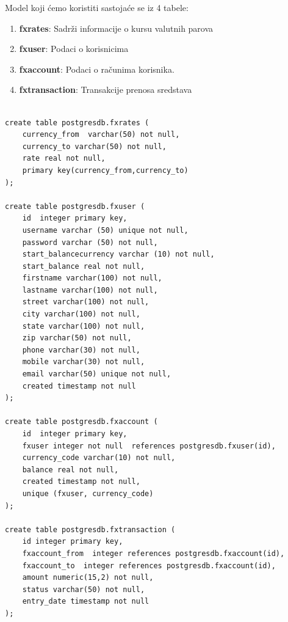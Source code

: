 \documentclass[12pt,oneside]{memoir}
\begin{document}
Model koji ćemo koristiti sastojaće se iz 4 tabele:

\begin{enumerate}
\item[\textbullet] \textbf{fxrates}: {
	Sadrži informacije o kursu valutnih parova
}
\item[\textbullet] \textbf{fxuser}:{
	Podaci o korisnicima
}
\item[\textbullet] \textbf{fxaccount}:{
	Podaci o računima korisnika.
}
\item[\textbullet] \textbf{fxtransaction}:{
	Transakcije prenosa sredstava
}
\end{enumerate}


\begin{lstlisting}[title={setup-postgres-model.sql},captionpos=t]

create table postgresdb.fxrates (
	currency_from  varchar(50) not null,
	currency_to varchar(50) not null,
	rate real not null,
	primary key(currency_from,currency_to)
);

create table postgresdb.fxuser (
	id  integer primary key,
	username varchar (50) unique not null,
	password varchar (50) not null,
	start_balancecurrency varchar (10) not null,
	start_balance real not null,
	firstname varchar(100) not null,
	lastname varchar(100) not null,
	street varchar(100) not null,
	city varchar(100) not null,
	state varchar(100) not null,
	zip varchar(50) not null,
	phone varchar(30) not null,
	mobile varchar(30) not null,
	email varchar(50) unique not null,
	created timestamp not null
);

create table postgresdb.fxaccount (
	id  integer primary key,
	fxuser integer not null  references postgresdb.fxuser(id),
	currency_code varchar(10) not null,
	balance real not null,
	created timestamp not null,
	unique (fxuser, currency_code)
);

create table postgresdb.fxtransaction (
	id integer primary key,
	fxaccount_from  integer references postgresdb.fxaccount(id),
	fxaccount_to  integer references postgresdb.fxaccount(id),
	amount numeric(15,2) not null,
	status varchar(50) not null,
	entry_date timestamp not null
);


\end{lstlisting}

\end{document}
